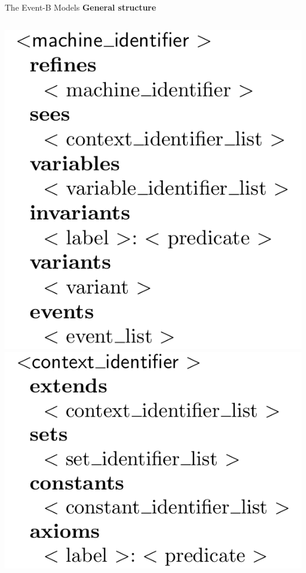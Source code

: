 \documentclass{beamer}
\begin{document}
  \begin{frame}{The Event-B Models}
    \centering
    \textbf{General structure}

    \begin{columns}
      \centering
      \includegraphics[width=\linewidth]{event-b_machine}
      \centering
      \includegraphics[width=\linewidth]{event-b_context}
    \end{columns}
  \end{frame}
\end{document}
